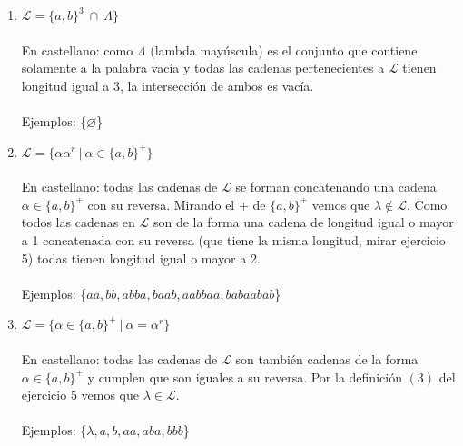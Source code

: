 \documentclass{article}
\begin{document}
{{\begin{enumerate}[label=\alph*.,font=\itshape]
{{    \\
    \\
    Ejemplos: \{$acbabbabbab, acacbabbabbabbab, aacbabbabbab$\}}}
    \item {$\mathcal{L} = \{ a, b \}^3 \ \cap \ \Lambda\}$
    \\
    \\
    {En castellano: como $\Lambda$ (lambda mayúscula) es el conjunto que contiene solamente a la palabra vacía y todas las cadenas pertenecientes a $\mathcal{L}$ tienen longitud igual a 3, la intersección de ambos es vacía.}
    \\
    \\
    Ejemplos: \{$\varnothing$\}}
    \item {$\mathcal{L} = \{ \alpha\alpha^r \ | \ \alpha \in \{ a,b \} ^+ \} $
    \\
    \\
    {En castellano: todas las cadenas de $\mathcal{L}$ se forman concatenando una cadena $\alpha \in \{a,b\}^+$ con su reversa. Mirando el + de $\{a,b\}^+$ vemos que $\lambda \notin \mathcal{L}$. Como todos las cadenas en $\mathcal{L}$ son de la forma una cadena de longitud igual o mayor a 1 concatenada con su reversa (que tiene la misma longitud, mirar ejercicio 5) todas tienen longitud igual o mayor a 2.}
    \\
    \\
    Ejemplos: \{$aa, bb, abba, baab, aabbaa, babaabab$\}}
    \item {$\mathcal{L} = \{ \alpha \in \{ a,b \} ^+ \ | \ \alpha = \alpha^r \} $
    \\
    \\
    {En castellano: todas las cadenas de $\mathcal{L}$ son también cadenas de la forma $\alpha \in \{a,b\}^+$ y cumplen que son iguales a su reversa. Por la definición $(3)$ del ejercicio 5 vemos que $\lambda \in \mathcal{L}$.}
    \\
    \\
    Ejemplos: \{$\lambda, a, b, aa, aba, bbb$\}}
\end{enumerate}

}}
\end{document}
